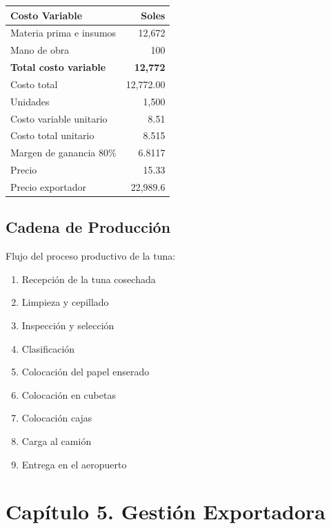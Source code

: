 \documentclass[
  stu,
  floatsintext,
  longtable,
  a4paper,
  nolmodern,
  notxfonts,
  notimes,
  12pt,
  colorlinks=true,linkcolor=blue,citecolor=blue,urlcolor=blue]{apa7}
\providecommand{\tightlist}{%
  \setlength{\itemsep}{0pt}\setlength{\parskip}{0pt}}
\newcounter{none} %
\begin{document}
\begin{table}

{\caption{{Estructura de Costos de
Producción}{\label{tbl-costos-produccion}}}}

{\def\LTcaptype{none} %
\begin{longtable}[]{@{}lr@{}}
\toprule\noalign{}
Costo Variable & Soles \\
\midrule\noalign{}
\endhead
\bottomrule\noalign{}
\endlastfoot
Materia prima e insumos & 12,672 \\
Mano de obra & 100 \\
\textbf{Total costo variable} & \textbf{12,772} \\
Costo total & 12,772.00 \\
Unidades & 1,500 \\
Costo variable unitario & 8.51 \\
Costo total unitario & 8.515 \\
Margen de ganancia 80\% & 6.8117 \\
Precio & 15.33 \\
Precio exportador & 22,989.6 \\
\end{longtable}
}

\end{table}

\subsection{Cadena de Producción}\label{cadena-de-producciuxf3n}

Flujo del proceso productivo de la tuna:

\begin{enumerate}
\def\labelenumi{\arabic{enumi}.}
\tightlist
\item
  Recepción de la tuna cosechada
\item
  Limpieza y cepillado
\item
  Inspección y selección
\item
  Clasificación
\item
  Colocación del papel enserado
\item
  Colocación en cubetas
\item
  Colocación cajas
\item
  Carga al camión
\item
  Entrega en el aeropuerto
\end{enumerate}

\section{Capítulo 5. Gestión
Exportadora}\label{capuxedtulo-5.-gestiuxf3n-exportadora}
\end{document}
